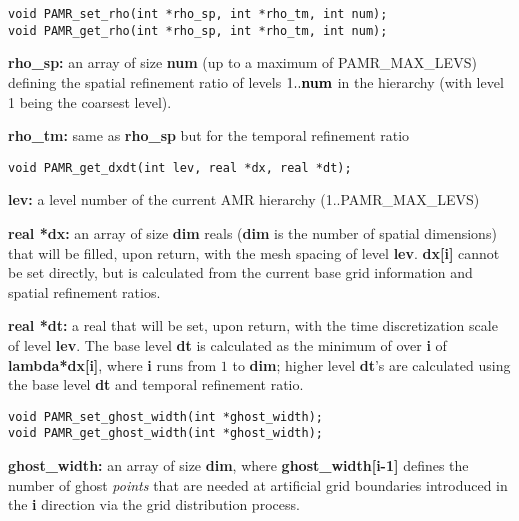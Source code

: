 \documentclass[aps,amssymb,unsortedaddress,nofootinbib]{revtex4}
\def\lsep{\itemsep 0.05in}
\begin{document}
\begin{verbatim}
void PAMR_set_rho(int *rho_sp, int *rho_tm, int num);
void PAMR_get_rho(int *rho_sp, int *rho_tm, int num);
\end{verbatim}

\begin{list}{}{\lsep}
\item {\bf *rho\_sp:} an array of size {\bf num} (up to a maximum of PAMR\_MAX\_LEVS) defining the spatial refinement 
                      ratio of levels $1..{\bf num}$ in the hierarchy (with level 1 being the coarsest level). 
\item {\bf *rho\_tm:} same as {\bf rho\_sp} but for the temporal refinement ratio
\end{list}


\begin{verbatim}
void PAMR_get_dxdt(int lev, real *dx, real *dt);
\end{verbatim}

\begin{list}{}{\lsep}
\item {\bf lev:} a level number of the current AMR hierarchy (1..PAMR\_MAX\_LEVS)
\item {\bf real *dx:} an array of size {\bf dim} reals ({\bf dim} is the number of
                      spatial dimensions) that will be filled, upon return, with the mesh spacing of level {\bf lev}.
                      {\bf dx[i]} cannot be set directly, but is calculated from the current
                      base grid information and spatial refinement ratios.
\item {\bf real *dt:} a real that will be set, upon return, with the time discretization scale 
                      of level {\bf lev}. The base level {\bf dt} is calculated as the minimum of 
                      over {\bf i} of {\bf lambda*dx[i]}, where {\bf i} runs from $1$ to {\bf dim};
                      higher level {\bf dt}'s are calculated using the base level {\bf dt} 
                      and temporal refinement ratio.

\end{list}


\begin{verbatim}
void PAMR_set_ghost_width(int *ghost_width);
void PAMR_get_ghost_width(int *ghost_width);
\end{verbatim}
\begin{list}{}{\lsep}
\item {\bf *ghost\_width:} an array of size {\bf dim}, where {\bf ghost\_width[i-1]} defines the 
                      number of ghost {\em points} that are needed at artificial grid boundaries 
                      introduced in the {\bf i} direction via the grid distribution
                      process.
\end{list}
\end{document}
